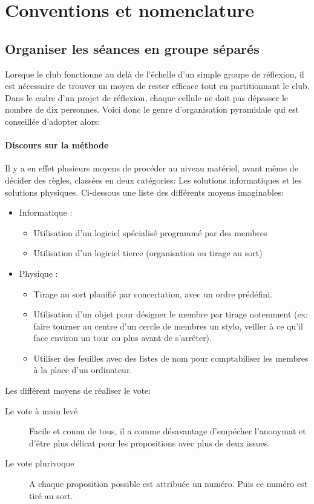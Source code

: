 \documentclass[a4paper,12pt]{article}
\begin{document}
\section{Conventions et nomenclature}

\subsection{Organiser les séances en groupe séparés}
Lorsque le club fonctionne au delà de l'échelle d'un simple groupe de réflexion, il est nécessaire de trouver un moyen de rester efficace tout en partitionnant le club. Dans le cadre d'un projet de réflexion, chaque cellule ne doit pas dépasser le nombre de dix personnes. Voici donc le genre d'organisation pyramidale qui est conseillée d'adopter alors:
\paragraph{Discours sur la méthode}
Il y a en effet plusieurs moyens de procéder au niveau matériel, avant même de décider des règles, classées en deux catégories: Les solutions informatiques et les solutions physiques. Ci-dessous une liste des différents moyens imaginables:
\begin{itemize}

 \item Informatique :
 \begin{itemize}
  \item Utilisation d'un logiciel spécialisé programmé par des membres
  \item Utilisation d'un logiciel tierce (organisation ou tirage au sort)
 \end{itemize}
 
 \item Physique :
 \begin{itemize}
  \item Tirage au sort planifié par concertation, avec un ordre prédéfini.
  \item Utilisation d'un objet pour désigner le membre par tirage notemment (ex: faire tourner au centre d'un cercle de membres un stylo, veiller à ce qu'il face environ un tour ou plus avant de s'arrêter).
  \item Utiliser des feuilles avec des listes de nom pour comptabiliser les membres à la place d'un ordinateur.
 \end{itemize}
\end{itemize}

Les différent moyens de réaliser le vote:
\begin{description}
 \item [Le vote à main levé] Facile et connu de tous, il a comme désavantage d'empécher l'anonymat et d'être plus délicat pour les propositions avec plus de deux issues.
 \item [Le vote plurivoque] A chaque proposition possible est attribuée un numéro. Puis ce numéro est tiré au sort.
\end{description}
\end{document}
